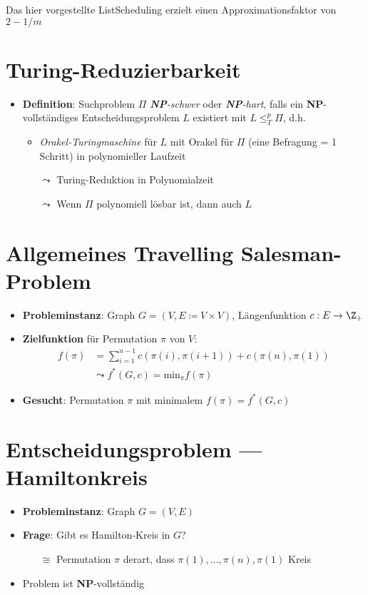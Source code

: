Das hier vorgestellte ListScheduling erzielt einen Approximationsfaktor von $2-1/m$ 

\section{Turing-Reduzierbarkeit}

\begin{itemize}
  \item \textbf{Definition}: Suchproblem $ \Pi $ \emph{\textbf{NP}-schwer} oder \emph{\textbf{NP}-hart}, falls ein \textbf{NP}-vollständiges Entscheidungsproblem $ L $ existiert mit $ L \leq_T^p \Pi $, d.h.
  \begin{itemize}
    \item \emph{Orakel-Turingmaschine} für $ L $ mit Orakel für $ \Pi $ (eine Befragung = 1 Schritt) in polynomieller Laufzeit
    \item[$ \leadsto $] Turing-Reduktion in Polynomialzeit
    \item[$ \leadsto $] Wenn $ \Pi $ polynomiell lösbar ist, dann auch $ L $
  \end{itemize}
\end{itemize}

\section{Allgemeines Travelling Salesman-Problem}

\begin{itemize}
  \item \textbf{Probleminstanz}: Graph $ G = (V, E \coloneqq V \times V) $, Längenfunktion $ c: E \to \Z_+ $
  \item \textbf{Zielfunktion} für Permutation $ \pi $ von $ V $:
  \begin{align*}
    f(\pi) &= \textstyle\sum_{i=1}^{ n-1 }c(\pi(i), \pi(i+1)) + c(\pi(n),\pi(1)) \\
     &\leadsto f^*(G,c) = \text{min}_\pi f(\pi)
  \end{align*}
  \item \textbf{Gesucht}: Permutation $ \pi $ mit minimalem $ f(\pi) = f^*(G,c) $
\end{itemize}


\section{Entscheidungsproblem --- Hamiltonkreis}

\begin{itemize}
  \item \textbf{Probleminstanz}: Graph $ G = (V,E) $
  \item \textbf{Frage}: Gibt es Hamilton-Kreis in $ G $?
  \begin{itemize}
    \item[$ \cong $] Permutation $ \pi $ derart, dass $ \pi(1), \dots,\pi(n),\pi(1) $ Kreis
  \end{itemize}
  \item Problem ist \textbf{NP}-vollständig
\end{itemize}


